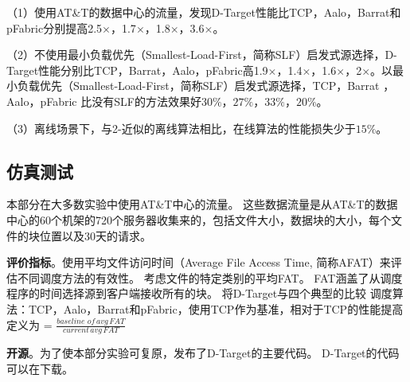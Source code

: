 （1）使用AT\&T的数据中心的流量，发现D-Target性能比TCP，Aalo\cite{chowdhury2015efficient}，Barrat\cite{dogar2014decentralized}和pFabric\cite{pFabric}分别提高2.5$\times$，1.7$\times$，1.8$\times$，3.6$\times$。

（2）不使用最小负载优先（Smallest-Load-First，简称SLF）启发式源选择，D-Target性能分别比TCP，Barrat，Aalo，pFabric高1.9$\times$，1.4$\times$，1.6$\times$，2$\times$。以最小负载优先（Smallest-Load-First，简称SLF）启发式源选择，TCP，Barrat \cite{dogar2014decentralized}，Aalo\cite{chowdhury2015efficient}，pFabric \cite{pFabric}比没有SLF的方法效果好$30\%$，$27\%$，$33\%$，$20\%$。

（3）离线场景下，与2-近似的离线算法相比，在线算法的性能损失少于$15\%$。






\subsection{仿真测试}
本部分在大多数实验中使用AT\&T中心的流量。
这些数据流量是从AT\&T的数据中心的60个机架的720个服务器收集来的，包括文件大小，数据块的大小，每个文件的块位置以及30天的请求。

\textbf{评价指标}。使用平均文件访问时间（Average File Access Time, 简称AFAT）来评估不同调度方法的有效性。
考虑文件的特定类别的平均FAT。 
FAT涵盖了从调度程序的时间选择源到客户端接收所有的块。
将D-Target与四个典型的比较
调度算法：TCP，Aalo\cite{chowdhury2015efficient}，Barrat\cite{dogar2014decentralized}和pFabric\cite{pFabric}，使用TCP作为基准，相对于TCP的性能提高定义为 = $\frac{baseline \, \,  of \,  avg \,  FAT}{current \,   avg \,  FAT}$

\textbf{开源}。为了使本部分实验可复原，发布了D-Target的主要代码。 
D-Target的代码可以在\cite{DTARGET}下载。

